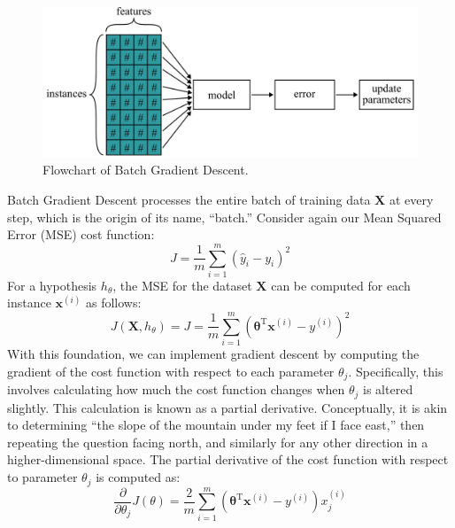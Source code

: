 \documentclass[12pt,letter]{article}
\begin{document}
\begin{figure}[H]
	\centering
	\includegraphics[width=5.4in]{../figures/gradient_descent_batch}
	\caption{Flowchart of Batch Gradient Descent.}
	\label{fig:gradient_descent_batch}
\end{figure}




Batch Gradient Descent processes the entire batch of training data $\textbf{X}$ at every step, which is the origin of its name, ``batch.'' Consider again our Mean Squared Error (MSE) cost function:
\begin{equation}
J = \frac{1}{m} \sum_{i=1}^{m} (\hat{y}_i - y_i)^2
\end{equation}
For a hypothesis $h_\theta$, the MSE for the dataset $\textbf{X}$ can be computed for each instance $\textbf{x}^{(i)}$ as follows:
\begin{equation}
J(\textbf{X}, h_\theta) = J = \frac{1}{m} \sum_{i=1}^{m} (\pmb{\theta}^\text{T}\textbf{x}^{(i)} - y^{(i)})^2
\end{equation}
With this foundation, we can implement gradient descent by computing the gradient of the cost function with respect to each parameter $\theta_j$. Specifically, this involves calculating how much the cost function changes when $\theta_j$ is altered slightly. This calculation is known as a partial derivative. Conceptually, it is akin to determining ``the slope of the mountain under my feet if I face east,'' then repeating the question facing north, and similarly for any other direction in a higher-dimensional space. The partial derivative of the cost function with respect to parameter $\theta_j$ is computed as:
\begin{equation}
\frac{\partial}{\partial \theta_j} J(\theta) = \frac{2}{m} \sum_{i=1}^{m}(\pmb{\theta}^\text{T}\textbf{x}^{(i)} - y^{(i)}) x_j^{(i)}
\label{eq:pd_cost_function}
\end{equation}
\end{document}

